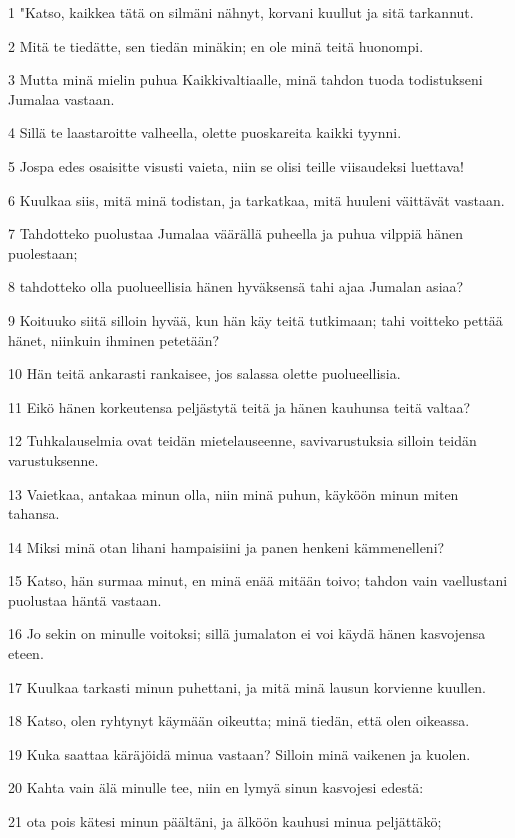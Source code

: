 \par 1 "Katso, kaikkea tätä on silmäni nähnyt, korvani kuullut ja sitä tarkannut.
\par 2 Mitä te tiedätte, sen tiedän minäkin; en ole minä teitä huonompi.
\par 3 Mutta minä mielin puhua Kaikkivaltiaalle, minä tahdon tuoda todistukseni Jumalaa vastaan.
\par 4 Sillä te laastaroitte valheella, olette puoskareita kaikki tyynni.
\par 5 Jospa edes osaisitte visusti vaieta, niin se olisi teille viisaudeksi luettava!
\par 6 Kuulkaa siis, mitä minä todistan, ja tarkatkaa, mitä huuleni väittävät vastaan.
\par 7 Tahdotteko puolustaa Jumalaa väärällä puheella ja puhua vilppiä hänen puolestaan;
\par 8 tahdotteko olla puolueellisia hänen hyväksensä tahi ajaa Jumalan asiaa?
\par 9 Koituuko siitä silloin hyvää, kun hän käy teitä tutkimaan; tahi voitteko pettää hänet, niinkuin ihminen petetään?
\par 10 Hän teitä ankarasti rankaisee, jos salassa olette puolueellisia.
\par 11 Eikö hänen korkeutensa peljästytä teitä ja hänen kauhunsa teitä valtaa?
\par 12 Tuhkalauselmia ovat teidän mietelauseenne, savivarustuksia silloin teidän varustuksenne.
\par 13 Vaietkaa, antakaa minun olla, niin minä puhun, käyköön minun miten tahansa.
\par 14 Miksi minä otan lihani hampaisiini ja panen henkeni kämmenelleni?
\par 15 Katso, hän surmaa minut, en minä enää mitään toivo; tahdon vain vaellustani puolustaa häntä vastaan.
\par 16 Jo sekin on minulle voitoksi; sillä jumalaton ei voi käydä hänen kasvojensa eteen.
\par 17 Kuulkaa tarkasti minun puhettani, ja mitä minä lausun korvienne kuullen.
\par 18 Katso, olen ryhtynyt käymään oikeutta; minä tiedän, että olen oikeassa.
\par 19 Kuka saattaa käräjöidä minua vastaan? Silloin minä vaikenen ja kuolen.
\par 20 Kahta vain älä minulle tee, niin en lymyä sinun kasvojesi edestä:
\par 21 ota pois kätesi minun päältäni, ja älköön kauhusi minua peljättäkö;
